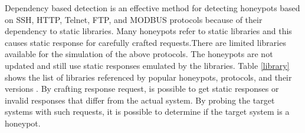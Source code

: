 Dependency based detection is an effective method for detecting honeypots based on SSH, HTTP, Telnet, FTP, and MODBUS protocols because of their dependency to static libraries. Many honeypots refer to static libraries and this causes static response for carefully crafted requests.There are limited libraries available for the simulation of the above protocols. The honeypots are not updated and still use static responses emulated by the libraries. Table \ref{library}  shows the list of libraries referenced by popular honeypots, protocols, and their versions \cite{Vetterl2018}. By crafting response request, is possible to get static responses or invalid responses that differ from the actual system. By probing the target systems with such requests, it is possible to determine if the target system is a honeypot.  
